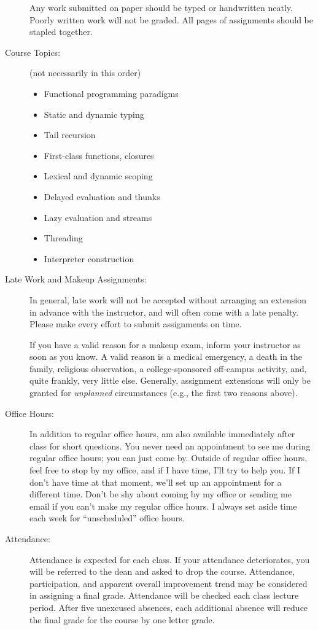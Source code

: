 \documentclass [letterpaper,11pt]{article}
\begin{document}
\begin{description}
Any work submitted on paper should be typed or handwritten neatly. Poorly written work will not be graded. All pages of assignments should be stapled together.

\item[Course Topics:] (not necessarily in this order) 
\begin{itemize} \setlength{\itemsep}{0em}\setlength{\parskip}{0pt}
	\item Functional programming paradigms
	\item Static and dynamic typing
	\item Tail recursion
	\item First-class functions, closures
	\item Lexical and dynamic scoping
	\item Delayed evaluation and thunks
	\item Lazy evaluation and streams
	\item Threading
	\item Interpreter construction
\end{itemize}

\item[Late Work and Makeup Assignments:]
In general, late work will not be accepted without arranging an extension in advance
with the instructor, and will often come with a late penalty.
Please make every effort to submit assignments on time.

If you have a valid reason for a makeup exam, inform your instructor
   as soon as you know.  A valid reason is a medical emergency, a death in the family, 
   religious observation, a college-sponsored off-campus activity, and, quite frankly, 
   very little else.  Generally, assignment extensions will only be granted for 
   \emph{unplanned} circumstances (e.g., the first two reasons above). 
   

\item[Office Hours:]
In addition to regular office hours, am also available immediately after class for
short questions. You never need an appointment to see me during regular office hours; you
can just come by. Outside of regular office hours, feel free to stop by my office, and if I have
time, I'll try to help you. If I don't have time at that moment, we'll set up an appointment
for a different time. Don't be shy about coming by my office or sending me email if you can't
make my regular office hours. I always set aside time each week for ``unscheduled'' office
hours.

\item[Attendance:]
Attendance is expected for each class. If your attendance deteriorates, you will be referred to the dean and asked to drop the course. Attendance, participation, and apparent overall improvement trend may be considered in assigning a final grade.
Attendance will be checked each class lecture period.  After five unexcused absences, each additional absence will reduce the final grade for the course by one letter grade.


\end{description}
\end{document}

